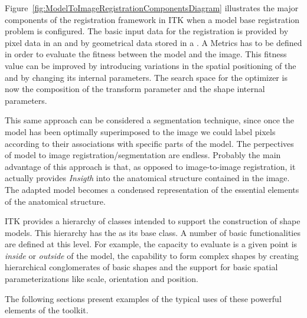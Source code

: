 Figure~\ref{fig:ModelToImageRegistrationComponentsDiagram} illustrates the
major components of the registration framework in ITK when a model base
registration problem is configured. The basic input data for the registration
is provided by pixel data in an  and by geometrical data stored
in a . A Metrics has to be defined in order to evaluate
the fitness between the model and the image. This fitness value can be improved
by introducing variations in the spatial positioning of the
 and by changing its internal parameters. The search
space for the optimizer is now the composition of the transform parameter and
the shape internal parameters.

This same approach can be considered a segmentation technique, since once the
model has been optimally superimposed to the image we could label pixels
according to their associations with specific parts of the model. The
perpectives of model to image registration/segmentation are endless.  Probably
the main advantage of this approach is that, as opposed to image-to-image
registration, it actually provides \emph{Insigth} into the anatomical structure
contained in the image. The adapted model becomes a condensed representation of
the essential elements of the anatomical structure.

ITK provides a hierarchy of classes intended to support the construction of
shape models. This hierarchy has the  as its base class.
A number of basic functionalities are defined at this level. For example, the
capacity to evaluate is a given point is \emph{inside} or \emph{outside} of the
model, the capability to form complex shapes by creating hierarchical
conglomerates of basic shapes and the support for basic spatial
parameterizations like scale, orientation and position.

The following sections present examples of the typical uses of these powerful
elements of the toolkit.

 




